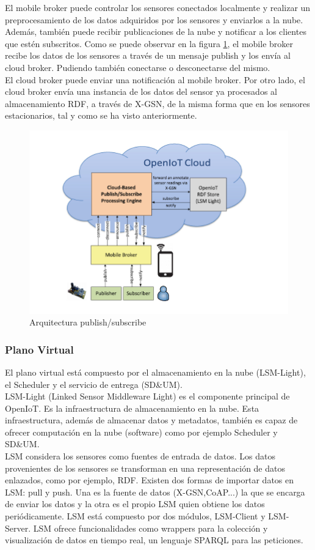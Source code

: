 \documentclass[12pt, twoside]{book}
\begin{document}
El mobile broker puede controlar los sensores conectados localmente y realizar un preprocesamiento de los datos adquiridos por los sensores y enviarlos a la nube. Además, también puede recibir publicaciones de la nube y notificar a los clientes que estén subscritos. Como se puede observar en la figura \ref{L405}, el mobile broker recibe los datos de los sensores a través de un mensaje publish y los envía al cloud broker. Pudiendo también conectarse o desconectarse del mismo.\\

El cloud broker puede enviar una notificación al mobile broker. Por otro lado, el cloud broker envía una instancia de los datos del sensor ya procesados al almacenamiento RDF, a través de X-GSN, de la misma forma que en los sensores estacionarios, tal y como se ha visto anteriormente.

\begin{figure}[H]
\centering
\includegraphics[scale=0.9]{images/mobilebroker_openiot}
\caption{Arquitectura publish/subscribe}\label{L405}
\end{figure}
\subsubsection*{Plano Virtual}
El plano virtual está compuesto por el almacenamiento en la nube (LSM-Light), el Scheduler y el servicio de entrega (SD\&UM). \\

LSM-Light (Linked Sensor Middleware Light) es el componente principal de OpenIoT. Es la infraestructura de almacenamiento en la nube. Esta infraestructura, además de almacenar datos y metadatos, también es capaz de ofrecer computación en la nube (software) como por ejemplo Scheduler y SD\&UM.\\ LSM considera los sensores como fuentes de entrada de datos. Los datos provenientes de los sensores se transforman en una representación de datos enlazados, como por ejemplo, RDF. Existen dos formas de importar datos en LSM: pull y push. Una es la fuente de datos (X-GSN,CoAP...) la que se encarga de enviar los datos y la otra es el propio LSM quien obtiene los datos periódicamente. LSM está compuesto por dos módulos, LSM-Client y LSM-Server. LSM ofrece funcionalidades como wrappers para la colección y visualización de datos en tiempo real, un lenguaje SPARQL para las peticiones.\\
\end{document}
